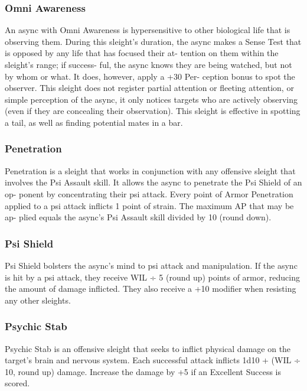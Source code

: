 \subsubsection{Omni Awareness}

An async with Omni Awareness is hypersensitive to 
other biological life that is observing them. During 
this sleight's duration, the async makes a Sense Test 
that is opposed by any life that has focused their at-
tention on them within the sleight's range; if success-
ful, the async knows they are being watched, but not 
by whom or what. It does, however, apply a +30 Per-
ception bonus to spot the observer. This sleight does 
not register partial attention or fleeting attention, or 
simple perception of the async, it only notices targets 
who are actively observing (even if they are concealing 
their observation). This sleight is effective in spotting a 
tail, as well as finding potential mates in a bar.

\subsubsection{Penetration}

Penetration is a sleight that works in conjunction with 
any offensive sleight that involves the Psi Assault skill. 
It allows the async to penetrate the Psi Shield of an op-
ponent by concentrating their psi attack. Every point 
of Armor Penetration applied to a psi attack inflicts 
1 point of strain. The maximum AP that may be ap-
plied equals the async's Psi Assault skill divided by 10 
(round down).

\subsubsection{Psi Shield}

Psi Shield bolsters the async's mind to psi attack and 
manipulation. If the async is hit by a psi attack, they 
receive WIL ÷ 5 (round up) points of armor, reducing 
the amount of damage inflicted. They also receive a 
+10 modifier when resisting any other sleights.

\subsubsection{Psychic Stab}

Psychic Stab is an offensive sleight that seeks to inflict 
physical damage on the target's brain and nervous 
system. Each successful attack inflicts 1d10 + (WIL ÷ 
10, round up) damage. Increase the damage by +5 if 
an Excellent Success is scored.

